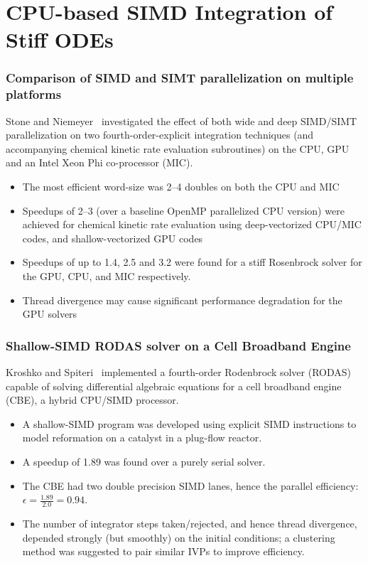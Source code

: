 \documentclass{beamer}
\newcounter{stiff}
\begin{document}
\section{CPU-based SIMD Integration of Stiff ODEs}

\begin{frame}
 \frametitle{Comparison of SIMD and SIMT parallelization on multiple platforms}
 Stone and Niemeyer~ investigated the effect of both wide and deep SIMD\slash SIMT parallelization on two fourth-order-explicit integration techniques (and accompanying chemical kinetic rate evaluation subroutines) on the CPU, GPU and an Intel Xeon Phi co-processor (MIC).
 \begin{itemize}
  \item The most efficient word-size was 2--4 doubles on both the CPU and MIC
  \item Speedups of \SIrange{2}{3}{\times} (over a baseline OpenMP parallelized CPU version) were achieved for chemical kinetic rate evaluation using deep-vectorized CPU\slash MIC codes, and shallow-vectorized GPU codes
  \item Speedups of up to \SI{1.4}{\times}, \SI{2.5}{\times} and \SI{3.2}{\times} were found for a stiff Rosenbrock solver for the GPU, CPU, and MIC respectively.
  \item Thread divergence may cause significant performance degradation for the GPU solvers
 \end{itemize}
\end{frame}

\begin{frame}
 \frametitle{Shallow-SIMD RODAS solver on a Cell Broadband Engine}
 Kroshko and Spiteri~ implemented a fourth-order Rodenbrock solver (RODAS) capable of solving differential algebraic equations for a cell broadband engine (CBE), a hybrid CPU\slash SIMD processor.
 \begin{itemize}
  \item A shallow-SIMD program was developed using explicit SIMD instructions to model  reformation on a  catalyst in a plug-flow reactor.
  \item A speedup of \SI{1.89}{\times} was found over a purely serial solver.
  \item The CBE had two double precision SIMD lanes, hence the parallel efficiency: $\epsilon = \frac{1.89}{2.0} = 0.94$.
  \item The number of integrator steps taken\slash rejected, and hence thread divergence, depended strongly (but smoothly) on the initial conditions; a clustering method was suggested to pair similar IVPs to improve efficiency.
 \end{itemize}
\end{frame}
\end{document}
